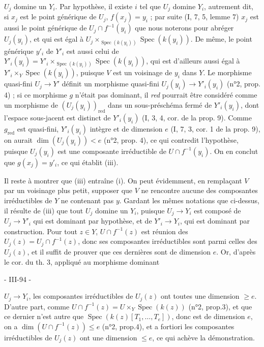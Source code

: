 $U_j$ domine un $Y_i$. Par hypothèse, il existe $i$ tel que $U_j$ domine $Y_i$, autrement dit, si $x_j$ est le point générique de $U_j$, $f(x_j) = y_i$ ; par suite (I, 7, 5, lemme 7) $x_j$ est aussi le point générique de $U_j \cap f^{-1}(y_i)$ que nous noterons pour abréger $U_j(y_i)$, et qui est égal à $U_j \times_{\operatorname{Spec}(k(y_i))} \operatorname{Spec}(k(y_i))$. De même, le point générique $y'_i$ de $Y'_i$ est aussi celui de $Y'_i(y_i) = Y'_i \times_{\operatorname{Spec}(k(y_i))} \operatorname{Spec}(k(y_i))$, qui est d'ailleurs aussi égal à $Y'_i \times_Y \operatorname{Spec}(k(y_i))$, puisque $V$ est un voisinage de $y_i$ dans $Y$. Le morphisme quasi-fini $U_j \to Y'$ définit un morphisme quasi-fini $U_j(y_i) \to Y'_i(y_i)$ (n°2, prop. 4) ; si ce morphisme $g$ n'était pas dominant, il \emph{red} pourrait être considéré comme un morphisme de $(U_j(y_i))_{\operatorname{red}}$ dans un sous-préschéma fermé de $Y'_i(y_i)$, dont l'espace sous-jacent est distinct de $Y'_i(y_i)$ (I, 3, 4, cor. de la prop. 9). Comme $g_{\operatorname{red}}$ est quasi-fini, $Y'_i(y_i)$ intègre et de dimension $e$ (I, 7, 3, cor. 1 de la prop. 9), on aurait $\dim(U_j(y_i)) < e$ (n°2, prop. 4), ce qui contredit l'hypothèse, puisque $U_j(y_i)$ est une composante irréductible de $U \cap f^{-1}(y_i)$. On en conclut que $g(x_j) = y'_i$, ce qui établit (iii).

Il reste à montrer que (iii) entraîne (i). On peut évidemment, en remplaçant $V$ par un voisinage plus petit, supposer que $V$ ne rencontre aucune des composantes irréductibles de $Y$ ne contenant pas $y$. Gardant les mêmes notations que ci-dessus, il résulte de (iii) que tout $U_j$ domine un $Y_i$, puisque $U_j \to Y_i$ est composé de $U_j \to Y'_i$ qui est dominant par hypothèse, et de $Y'_i \to Y_i$, qui est dominant par construction. Pour tout $z \in Y$, $U \cap f^{-1}(z)$ est réunion des $U_j(z) = U_j \cap f^{-1}(z)$, donc ses composantes irréductibles sont parmi celles des $U_j(z)$, et il suffit de prouver que ces dernières sont de dimension $e$. Or, d'après le cor. du th. 3, appliqué au morphisme dominant

\newpage


- III-94 -

$U_j \to Y_i$, les composantes irréductibles de $U_j(z)$ ont toutes une dimension $\ge e$. D'autre part, comme $U \cap f^{-1}(z) = U \times_Y \operatorname{Spec}(k(z))$ (n°2, prop.3), et que ce dernier n'est autre que $\operatorname{Spec}(k(z)[T_1, \dots, T_e])$, donc est de dimension $e$, on a $\dim(U \cap f^{-1}(z)) \le e$ (n°2, prop.4), et a fortiori les composantes irréductibles de $U_j(z)$ ont une dimension $\le e$, ce qui achève la démonstration.

